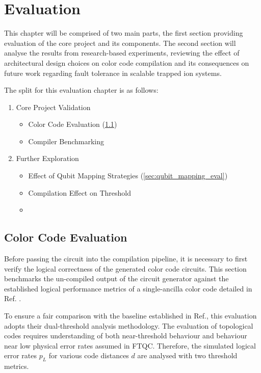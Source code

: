 \chapter{Evaluation}
\label{chapter:eval}

This chapter will be comprised of two main parts, the first section providing evaluation of the core project and its components. The second section will analyse the results from research-based experiments, reviewing the effect of architectural design choices on color code compilation and its consequences on future work regarding fault tolerance in scalable trapped ion systems.

The split for this evaluation chapter is as follows:
\begin{enumerate}
    \item Core Project Validation
    \begin{itemize}
        \item Color Code Evaluation (\ref{sec:color_code_eval})
        \item Compiler Benchmarking
        
    \end{itemize}
    \item Further Exploration
    \begin{itemize}
        \item Effect of Qubit Mapping Strategies (\ref{sec:qubit_mapping_eval})
        \item Compilation Effect on Threshold
        \item 
    \end{itemize}
        
\end{enumerate}


\section{Color Code Evaluation}
\label{sec:color_code_eval}

Before passing the circuit into the compilation pipeline, it is necessary to first verify the logical correctness of the generated color code circuits.
This section benchmarks the un-compiled output of the circuit generator against the established logical performance metrics of a single-ancilla color code detailed in Ref. \cite{flaggedweightcolorcode}. 

To ensure a fair comparison with the baseline established in Ref.\cite{flaggedweightcolorcode}, this evaluation adopts their dual-threshold analysis methodology. The evaluation of topological codes requires understanding of both near-threshold behaviour and behaviour near low physical error rates assumed in FTQC. Therefore, the simulated logical error rates $p_L$ for various code distances $d$ are analysed with two threshold metrics.

